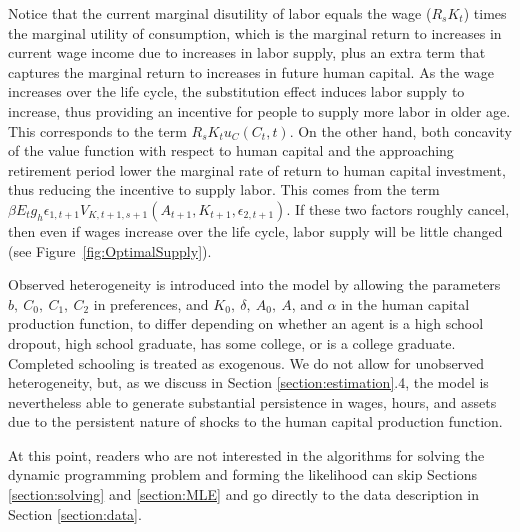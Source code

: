 \documentclass{article}
\begin{document}
           Notice that the current marginal disutility of labor equals the wage ($R_s K_t$) times the marginal utility of consumption, which is the marginal return to increases in current wage income due to increases in labor supply, plus an extra term that captures the marginal return to increases in future human capital. As the wage increases over the life cycle, the substitution effect induces labor supply to increase, thus providing an incentive for people to supply more labor in older age. This corresponds to the term $R_s K_t u_C(C_t, t)$. On the other hand, both concavity of the value function with respect to human capital and the approaching retirement period lower the marginal rate of return to human capital investment, thus reducing the incentive to supply labor. This comes from the term $\beta E_t g_h \epsilon_{1,t+1} V_{K,t+1,s+1}(A_{t+1}, K_{t+1}, \epsilon_{2,t+1})$. If these two factors roughly cancel, then even if wages increase over the life cycle, labor supply will be little changed (see Figure~\ref{fig:OptimalSupply}).\par
           Observed heterogeneity is introduced into the model by allowing the parameters $b,~C_0,~C_1,~C_2$ in preferences, and $K_0,~\delta,~A_0,~A$, and $\alpha$ in the human capital production function, to differ depending on whether an agent is a high school dropout, high school graduate, has some college, or is a college graduate. Completed schooling is treated as exogenous. We do not allow for unobserved heterogeneity, but, as we discuss in Section \ref{section:estimation}.4, the model is nevertheless able to generate substantial persistence in wages, hours, and assets due to the persistent nature of shocks to the human capital production function. \par
           At this point, readers who are not interested in the algorithms for solving the dynamic programming problem and forming the likelihood can skip Sections \ref{section:solving} and \ref{section:MLE} and go directly to the data description in Section \ref{section:data}.          
\end{document}
